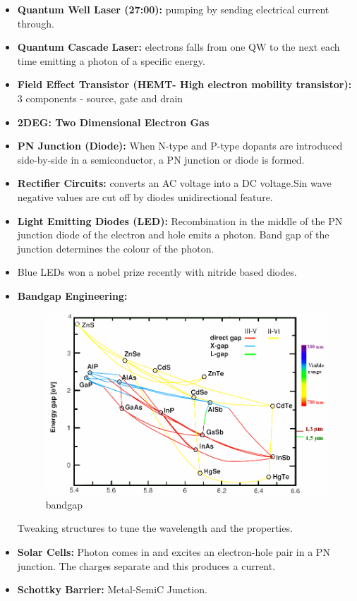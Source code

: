 \begin{itemize}
    \item \textbf{Quantum Well Laser (27:00):} pumping by sending electrical current through. 
    \item \textbf{Quantum Cascade Laser:} electrons falls from one QW to the next each time emitting a photon of a specific energy.
    \item \textbf{Field Effect Transistor (HEMT- High electron mobility transistor):} 3 components - source, gate and drain
    \item \textbf{2DEG: Two Dimensional Electron Gas}
    \item \textbf{PN Junction (Diode):} When N-type and P-type dopants are introduced side-by-side in a semiconductor, a PN junction or diode is formed. \item \textbf{Rectifier Circuits:} converts an AC voltage into a DC voltage.Sin wave negative values are cut off by diodes unidirectional feature. 
    \item \textbf{Light Emitting Diodes (LED):} Recombination in the middle of the PN junction diode of the electron and hole emits a photon. Band gap of the junction determines the colour of the photon.
    \item Blue LEDs won a nobel prize recently with nitride based diodes.
    \item \textbf{Bandgap Engineering:}
    \begin{figure}
    \centering
    \includegraphics[width=0.75\linewidth]{Images/bandgap_misfit.png}
    \caption{bandgap}
    \label{fig:bandgapengineering}
    \end{figure}
    Tweaking structures to tune the wavelength and the properties.
    \item \textbf{Solar Cells:} Photon comes in and excites an electron-hole pair in a PN junction. The charges separate and this produces a current.
    \item \textbf{Schottky Barrier:} Metal-SemiC Junction.

\end{itemize}
